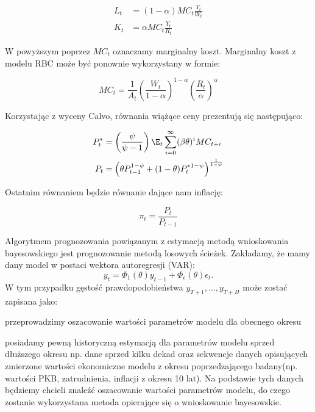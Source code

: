 \begin{align}
    L_t &= (1 - \alpha)MC_t \frac{Y_t}{W_t} \\
    K_t &= \alpha MC_t \frac{Y_t}{R_t}
\end{align}

W powyższym poprzez $MC_t$ oznaczamy marginalny koszt. Marginalny koszt z modelu RBC może być ponownie wykorzystany w formie:

\begin{equation}
    MC_t = \frac{1}{A_t}\left( \frac{W_t}{1-\alpha} \right)^{1-\alpha} \left( \frac{R_t}{\alpha} \right)^\alpha
\end{equation}


Korzystając z wyceny Calvo, równania wiążące ceny prezentują się następująco:

\begin{align}
    P^*_t &= \left( \frac{\psi}{\psi-1}\right)\E_t \sum_{i=0}^\infty(\beta \theta)^iMC_{t+i} \\
    P_t &= \left( \theta P^{1-\psi}_{t-1} + (1-\theta)P_t^{*1-\psi}\right)^{\frac{1}{1-\psi}}
\end{align}

Ostatnim równaniem będzie równanie dające nam inflację:

\begin{equation}
    \pi_t = \frac{P_t}{P_{t-1}}
\end{equation}

Algorytmem prognozowania powiązanym z estymacją metodą wnioskowania bayesowskiego jest prognozowanie metodą losowych ścieżek. Zakładamy, że mamy dany model w postaci wektora autoregresji (VAR):
\begin{equation}
    \label{eqn:varModelProg}
    y_t = \Phi_1(\theta)y_{t-1}+\Phi_{\epsilon}(\theta)\epsilon_t.
\end{equation}
W tym przypadku gęstość prawdopodobieństwa $y_{T+1}, \dots, y_{T+H}$ może zostać zapisana jako:

przeprowadzimy oszacowanie wartości parametrów modelu dla obecnego okresu


posiadamy pewną historyczną estymacją dla parametrów modelu sprzed dłuższego okresu np. dane sprzed kilku dekad oraz sekwencje danych opisujących zmierzone wartości ekonomiczne modelu z okresu poprzedzającego badany(np. wartości PKB, zatrudnienia, inflacji z okresu 10 lat). Na podstawie tych danych będziemy chcieli znaleźć oszacowanie wartości parametrów modelu, do czego zostanie wykorzystana metoda opierające się o wnioskowanie bayesowskie.


